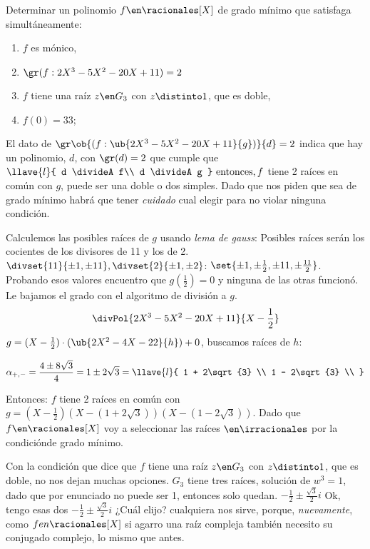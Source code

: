 \begin{enunciado}{\ejExtra}
  Determinar un polinomio $f \en \racionales[X]$ de grado mínimo que satisfaga
  simultáneamente:\par

  \begin{enumerate}[label=$\scriptscriptstyle\blacksquare$]
    \item $f$ es mónico,
    \item $\gr(f:2X^3-5X^2-20X +11) = 2$
    \item $f$ tiene una raíz $z \en G_3$ con $z \distinto 1$, que es doble,
    \item $f(0) = 33$;
  \end{enumerate}
\end{enunciado}

El dato de
$\gr\ob{(f:\ub{2X^3-5X^2-20X +11}{g})}{d} = 2$ indica que hay un polinomio,
$d$, con $\gr(d) = 2$ que cumple que
$
  \llave{l}{
    d \divideA f\\
    d \divideA g
  } \text{ entonces,}\, f
$ tiene 2 raíces en común con $g$, puede ser una doble o dos simples. Dado que nos piden que sea de grado mínimo
habrá que tener \textit{cuidado} cual elegir para no violar ninguna condición.\par
Calculemos las posibles raíces de $g$ usando \textit{lema de gauss}:
Posibles raíces serán los cocientes de los divisores de 11 y los de 2.
$\divset{11}{\pm1,\pm11}, \divset{2}{\pm1,\pm2}$:
$\set{\pm 1,\pm\frac{1}{2},\pm 11, \pm\frac{11}{2}}$.
Probando esos valores encuentro que $g(\frac{1}{2}) = 0$ y ninguna de las
otras funcionó. Le bajamos el grado con el algoritmo de división a $g$.
$$
  \divPol{2X^3 - 5X^2 - 20X + 11}{X - \frac{1}{2}}
$$
$g = (X-\frac{1}{2})\cdot(\ub{2X^2 - 4X -22}{h}) + 0 $, buscamos raíces de $h$:\par

$$\alpha_{+,-} =
  \frac{4 \pm 8\sqrt{3}}{4} =
  1 \pm 2\sqrt{3} =
  \llave{l}{
    1 + 2\sqrt{3} \\
    1 - 2\sqrt{3} \\
  }
$$

Entonces:
$f$ tiene 2 raíces en común con
$g = (X - \frac{1}{2})(X - (1+2\sqrt{3})) (X - (1-2\sqrt{3})) $. Dado que
$f \en \racionales[X]$  voy a seleccionar las raíces $ \en \irracionales$ por
la condiciónde grado mínimo.\bigskip

Con la condición que dice que $f$ tiene una raíz $z \en G_3$ con $z \distinto 1$,
que es doble, no nos dejan muchas opciones. $G_3$ tiene tres raíces, solución
de $w^3 = 1$, dado que por enunciado no puede ser 1, entonces solo quedan.
$-\frac{1}{2} \pm \frac{\sqrt{3}}{2}i$ 
Ok, tengo esas dos $-\frac{1}{2} \pm \frac{\sqrt{3}}{2}i$ ¿Cuál elijo? cualquiera nos
sirve, porque, \textit{nuevamente}, como $f en \racionales[X]$ si agarro una raíz compleja
también necesito su conjugado complejo, lo mismo que antes.\par

